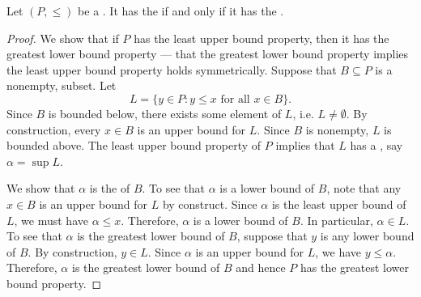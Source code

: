 \begin{lemma} \label{lemma:least_upper_bound_and_greatest_lower_bound_property_on_a_partially_ordered_set_are_equivalent}
    Let $(P, \leq )$ be a .
    It has the  if and only if it has the .
\end{lemma}
\begin{proof}
    We show that if $P$ has the least upper bound property, then it has the greatest lower bound property --- that the greatest lower bound property implies the least upper bound property holds symmetrically. Suppose that $B \subseteq P$ is a nonempty,  subset. Let 
    $$L = \{y \in P: y \leq x \text{ for all } x \in B\}.$$
    Since $B$ is bounded below, there exists some element of $L$, i.e. $L \neq \emptyset$. By construction, every $x \in B$ is an upper bound for $L$. Since $B$ is nonempty, $L$ is bounded above. The least upper bound property of $P$ implies that $L$ has a , say $\alpha = \sup L$. 
    
    We show that $\alpha$ is the  of $B$. To see that $\alpha$ is a lower bound of $B$, note that any $x \in B$ is an upper bound for $L$ by construct. Since $\alpha$ is the least upper bound of $L$, we must have $\alpha \leq x$. Therefore, $\alpha$ is a lower bound of $B$. In particular, $\alpha \in L$. To see that $\alpha$ is the greatest lower bound of $B$, suppose that $y$ is any lower bound of $B$. By construction, $y \in L$. Since $\alpha$ is an upper bound for $L$, we have $y \leq \alpha$. Therefore, $\alpha$ is the greatest lower bound of $B$ and hence $P$ has the greatest lower bound property.
\end{proof}